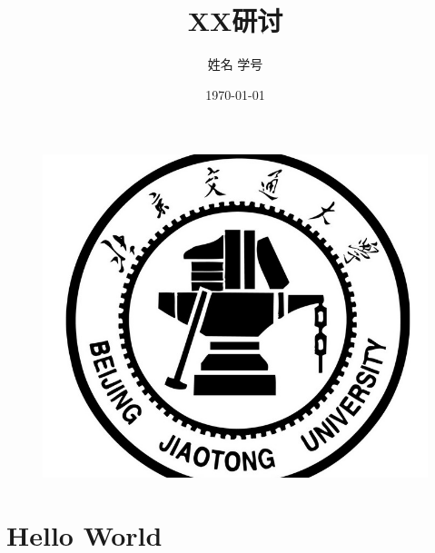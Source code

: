 \documentclass[11pt,a4paper,UTF8]{ctexart}
\title{XX研讨}
\author{姓名 学号}
\date{\today}
\begin{document}
	\begin{figure}
	\centering
	\includegraphics[width=0.7\linewidth]{Pictures/BJTU_logo}
	\end{figure}

	
	\maketitle
	\newpage
	\tableofcontents
	\newpage

	\section{Hello World}	

	\newpage
\end{document}
